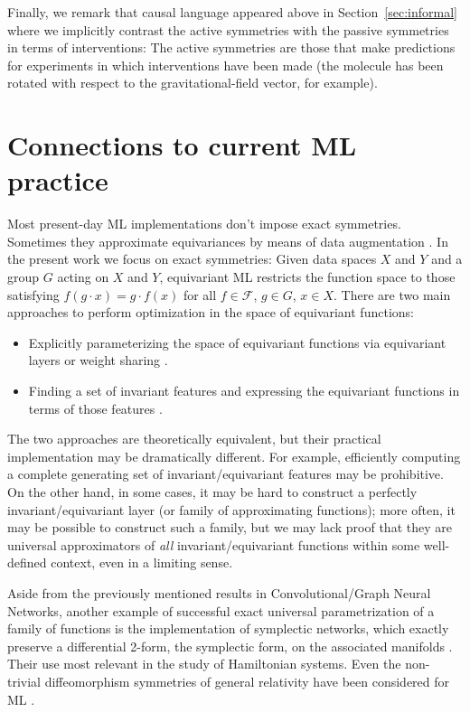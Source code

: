 \documentclass{article} %
\renewcommand{\mathcal}[1]{\mathscr{#1}} %
\newcommand{\sectionname}{Section}
\newcommand{\secref}[1]{\sectionname~\ref{#1}}
\begin{document}
Finally, we remark that causal language appeared above in \secref{sec:informal} where we implicitly contrast the active symmetries with the passive symmetries in terms of interventions:
The active symmetries are those that make predictions for experiments in which interventions have been made (the molecule has been rotated with respect to the gravitational-field vector, for example).

\section{Connections to current ML practice}\label{sec:practice}
Most present-day ML implementations don't impose exact symmetries. Sometimes they approximate equivariances by means of data augmentation \citep{chen2020group, huang2022quantifying}.
In the present work we focus on exact symmetries: Given data spaces $X$ and $Y$ and a group $G$ acting on $X$ and $Y$, equivariant ML restricts the function space to those satisfying  $f(g\cdot x) = g \cdot f(x)$ for all $f\in \mathcal F$, $g\in G$, $x\in X$.
There are two main approaches to perform optimization in the space of equivariant functions:
\begin{itemize}
    \item Explicitly parameterizing the space of equivariant functions via equivariant layers or weight sharing \citep{cohen2016group, kondor2018convolution, thomas2018tensor, geiger2022e3nn, finzi2020generalizing, finzi2021practical}.
    \item Finding a set of invariant features and expressing the equivariant functions in terms of those features \citep{villar2021scalars,blum2022equivariant}.
\end{itemize}
The two approaches are theoretically equivalent, but their practical implementation may be dramatically different. For example, efficiently computing a complete generating set of invariant/equivariant features may be prohibitive. On the other hand, in some cases, it may be hard to construct a perfectly invariant/equivariant layer (or family of approximating functions); more often, it may be possible to construct such a family, but we may lack proof that they are universal approximators of \textit{all} invariant/equivariant functions within some well-defined context, even in a limiting sense.

Aside from the previously mentioned results in Convolutional/Graph Neural Networks, another example of successful exact universal parametrization of a family of functions is the implementation of symplectic networks, which exactly preserve a differential 2-form, the symplectic form, on the associated manifolds \citep{sympnets,henonnets}. Their use most relevant in the study of Hamiltonian systems. Even the non-trivial diffeomorphism symmetries of general relativity have been considered for ML \citep{weiler}.
 
\end{document}

